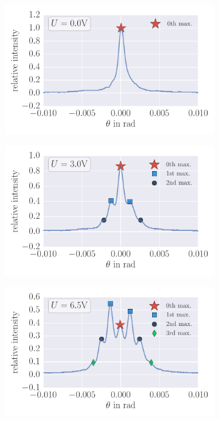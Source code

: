 \begin{figure}[H]
\label{fig:ultrasonic1}
\centering
    \begin{subfigure}[b]{\picwidth}
        \includegraphics[width=1.0\textwidth]{analysis/figures/raman_001}
        \caption{}
        \label{fig:raman_001}
    \end{subfigure}
    \begin{subfigure}[b]{\picwidth}
        \includegraphics[width=1.0\textwidth]{analysis/figures/raman_007}
        \caption{}
        \label{fig:raman_007}
    \end{subfigure}
    \begin{subfigure}[b]{\picwidth}
        \includegraphics[width=1.0\textwidth]{analysis/figures/raman_014}

\end{subfigure}
\end{figure}
